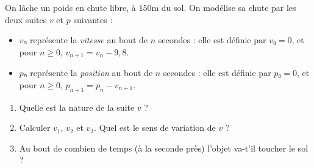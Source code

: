 \documentclass[
	classe=$1^{ere}STI2D$
]{évaluation}
\begin{document}
\begin{exercice}[4]
	On lâche un poids en chute libre, à $150$m du sol. On modélise sa chute par les deux suites $v$ et $p$ suivantes :

	\begin{itemize}
		\item $vₙ$ représente la \textit{vitesse} au bout de $n$ secondes : elle est définie par $v₀ = 0$, et pour $n ≥ 0$, $v_{n+1} = v_n - 9,8$.
		\item $pₙ$ représente la \textit{position} au bout de $n$ secondes : elle est définie par $p₀ = 0$, et pour $n ≥ 0$, $p_{n+1} = p_n - v_{n+1}$.
	\end{itemize}

	\begin{enumerate}
		\item Quelle est la nature de la suite $v$ ?
		\item Calculer $v_1$, $v_2$ et $v_3$. Quel est le sens de variation de $v$ ?
		\item Au bout de combien de temps (à la seconde près) l'objet va-t'il toucher le sol ?
	\end{enumerate}
\end{exercice}
\end{document}
